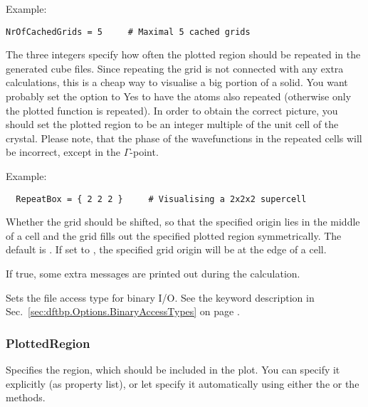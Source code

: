 \begin{description}
Example:
\begin{verbatim}
NrOfCachedGrids = 5     # Maximal 5 cached grids
\end{verbatim}

\item[\is{RepeatBox}] The three integers specify how often the plotted
  region should be repeated in the generated cube files. Since
  repeating the grid is not connected with any extra calculations,
  this is a cheap way to visualise a big portion of a solid.  You want
  probably set the  option to Yes to have the
  atoms also repeated (otherwise only the plotted function is
  repeated).  In order to obtain the correct picture, you should set
  the plotted region to be an integer multiple of the unit cell of the
  crystal. Please note, that the phase of the wavefunctions in the
  repeated cells will be incorrect, except in the $\Gamma$-point.

Example:
\begin{verbatim}
  RepeatBox = { 2 2 2 }     # Visualising a 2x2x2 supercell
\end{verbatim}

\item[\is{ShiftGrid}] Whether the grid should be shifted, so that the specified
  origin lies in the middle of a cell and the grid fills out the specified
  plotted region symmetrically. The default is . If set to , the
  specified grid origin will be at the edge of a cell.

\item[\is{Verbose}] If true, some extra messages are printed out
  during the calculation.

\item[\is{BinaryAccessTypes}] Sets the file access type for binary I/O. See the
  keyword description in Sec.~\ref{sec:dftbp.Options.BinaryAccessTypes} on page
  .

\end{description}


\subsubsection{PlottedRegion}
\label{sec:waveplot.PlottedRegion}

Specifies the region, which should be included in the plot. You can
specify it explicitly (as property list), or let \waveplot{} specify
it automatically using either the  or the
 methods.

